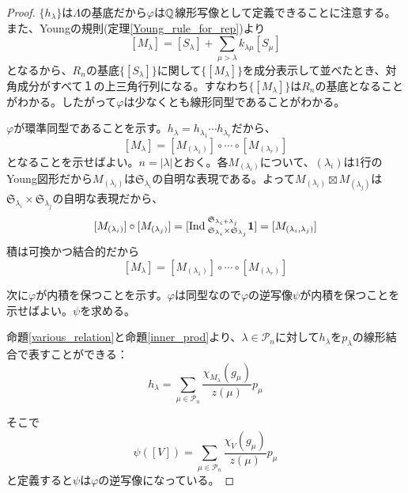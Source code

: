 \documentclass{ltjsreport}
\begin{document}
\begin{proof}
  $\{h_\lambda\}$は$\Lambda$の基底だから$\varphi$は$\mathbb{Q}$線形写像として定義できることに注意する。また、Youngの規則(定理\ref{Young_rule_for_rep})より
  \[
  [M_\lambda]=[S_\lambda]+\sum_{\mu>\lambda}k_{\lambda\mu}[S_\mu]
  \]
  となるから、$R_n$の基底$\{[S_\lambda]\}$に関して$\{[M_\lambda]\}$を成分表示して並べたとき、対角成分がすべて１の上三角行列になる。すなわち$\{[M_\lambda]\}$は$R_n$の基底となることがわかる。したがって$\varphi$は少なくとも線形同型であることがわかる。

  $\varphi$が環準同型であることを示す。$h_\lambda=h_{\lambda_1}\cdots h_{\lambda_r}$だから、
  \[
  [M_\lambda]=[M_{(\lambda_1)}]\circ\cdots\circ[M_{(\lambda_r)}]  
  \]
  となることを示せばよい。$n=|\lambda|$とおく。各$M_{(\lambda_i)}$について、$(\lambda_i)$は1行のYoung図形だから$M_{(\lambda_i)}$は$\mathfrak{S}_{\lambda_i}$の自明な表現である。よって$M_{(\lambda_i)}\boxtimes M_{(\lambda_j)}$は$\mathfrak{S}_{\lambda_i}\times\mathfrak{S}_{\lambda_j}$の自明な表現だから、
  \[
  [M_{(\lambda_i)}]\circ[M_{(\lambda_j)}]
  =[\text{Ind}\:_{\mathfrak{S}_{\lambda_i}\times\mathfrak{S}_{\lambda_j}}^{\mathfrak{S}_{\lambda_i+\lambda_j}}\mathbf{1}]
  =[M_{(\lambda_i,\lambda_j)}]
  \]
  積は可換かつ結合的だから
  \[
  [M_\lambda]=[M_{(\lambda_1)}]\circ\cdots\circ[M_{(\lambda_r)}]  
  \]
  
  次に$\varphi$が内積を保つことを示す。$\varphi$は同型なので$\varphi$の逆写像$\psi$が内積を保つことを示せばよい。$\psi$を求める。
  
  命題\ref{various_relation}と命題\ref{inner_prod}より、$\lambda\in\mathcal{P}_n$に対して$h_\lambda$を$p_\lambda$の線形結合で表すことができる：
  \[
  h_\lambda=\sum_{\mu\in\mathcal{P}_n}\frac{\chi_{M_\lambda}(g_\mu)}{z(\mu)}p_\mu  
  \]
  
  そこで
  \[
  \psi([V])=\sum_{\mu\in\mathcal{P}_n}\frac{\chi_V(g_\mu)}{z(\mu)}p_\mu  
  \]
  と定義すると$\psi$は$\varphi$の逆写像になっている。


\end{proof}
\end{document}
